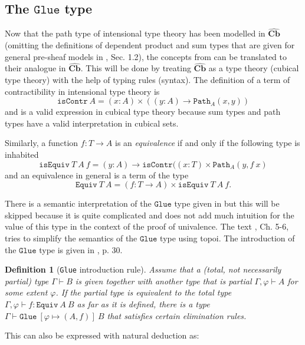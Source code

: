 \documentclass[12pt,a4paper,twoside,xetex]{book} %
\newcommand{\keyword}[1]{\emph{#1}\index{#1}}
\newtheorem{definition}[theorem]{Definition}
\newcommand{\psh}[1]{\widehat{#1}}
\newcommand{\op}[1]{\mathtt{#1}}
\newcommand{\cube}[0]{\textbf{Cb}}
\newcommand{\pa}[3]{\op{Path}_{#1}\left(#2, #3\right)}
\newcommand{\isequiv}[3]{\op{isEquiv} \ #1 \ #2 \ #3}
\begin{document}
\subsection{The $\op{Glue}$ type}\label{glueOp}



Now that the path type of intensional type theory has been modelled in $\psh{\cube}$ (omitting the definitions of dependent product and sum types that are given for general pre-sheaf models in \cite{Huber2016}, Sec. 1.2), the concepts from  can be translated to their analogue in $\psh{\cube}$. This will be done by treating $\psh{\cube}$ as a type theory (cubical type theory) with the help of typing rules (syntax). The 
definition of a term of contractibility in intensional type theory is 
$$\op{isContr} \ A = (x:A) \times \left( (y:A) \rightarrow \pa{A}{x}{y} 
\right)$$ and is a valid expression in cubical type theory because sum types 
and path types have a valid interpretation in cubical sets.

Similarly, a function $f:T \rightarrow A$ is an \keyword{equivalence} if and 
only if the following type is inhabited $$\isequiv{T}{A}{f} = (y: A) 
\rightarrow \op{isContr} ((x:T) \times \pa{A}{y}{f \ x}$$  and an equivalence 
in general is a term of the type $$\op{Equiv} \ T \ A = (f:T\rightarrow A) 
\times \isequiv{T}{A}{f}.$$ 
 

There is a semantic interpretation of the $\op{Glue}$ type given in \cite{Huber2016} but this will be skipped because it is quite 
complicated and does not add much intuition for the value of this type in the 
context of the proof of univalence. The text \cite{Orton2019}, Ch. 5-6, 
tries to simplify the semantics of the $\op{Glue}$ type using topoi. The 
introduction of the $\op{Glue}$ type is given in \cite{Orton2019}, p. 30.

\begin{definition}[\texttt{Glue} introduction rule]
Assume that a (total, not 
necessarily partial) type $\Gamma \vdash B$ is given together with another type that is partial 
$\Gamma, \varphi \vdash A$ for some extent $\varphi$. If the partial type is 
equivalent to the total type $\Gamma, \varphi \vdash f : \op{Equiv} \ A \ B $ 
as far as it is defined, there is a type $\Gamma \vdash \op{Glue} \ \left[ 
\varphi \mapsto \left( A, f \right) \right] \ B$ that satisfies certain 
elimination rules. 
\end{definition}


 This can also be expressed with natural deduction as:
\end{document}
